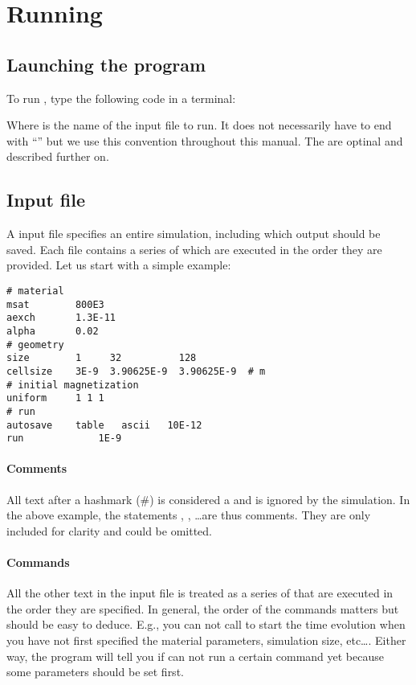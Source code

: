 \section{Running}

\subsection{Launching the program}

To run \prog, type the following code in a terminal:


Where \textit{} is the name of the input file to run. It does not necessarily have to end with ``'' but we use this convention throughout this manual. The \textit{} are optinal and described further on. 

\subsection{Input file}

A \prog input file specifies an entire simulation, including which output should be saved. Each file contains a series of  which are executed in the order they are provided. Let us start with a simple example:


\begin{verbatim}
# material
msat       	800E3 
aexch      	1.3E-11
alpha      	0.02
# geometry 
size       	1     32          128    
cellsize   	3E-9  3.90625E-9  3.90625E-9  # m
# initial magnetization
uniform		1 1 1
# run
autosave	table	ascii	10E-12
run          	1E-9
\end{verbatim}

\paragraph{Comments} All text after a hashmark (\#) is considered a  and is ignored by the simulation. In the above example, the statements , , \ldots are thus comments. They are only included for clarity and could be omitted.

\paragraph{Commands} All the other text in the input file is treated as a series of  that are executed in the order they are specified. In general, the order of the commands matters but should be easy to deduce.  E.g., you can not call  to start the time evolution when you have not first specified the material parameters, simulation size, etc\ldots. Either way, the program will tell you if can not run a certain command yet because some parameters should be set first.



